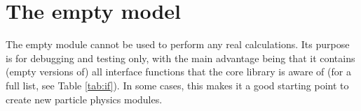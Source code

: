 \chapter{The empty model}

The empty module cannot be used to perform any real calculations. Its purpose is for debugging
and testing only, with the main advantage being that it contains (empty versions of) all interface 
functions that the core library is aware of (for a full list, see Table \ref{tab:if}). In some cases, this 
makes it a good starting point to create new particle physics modules.
